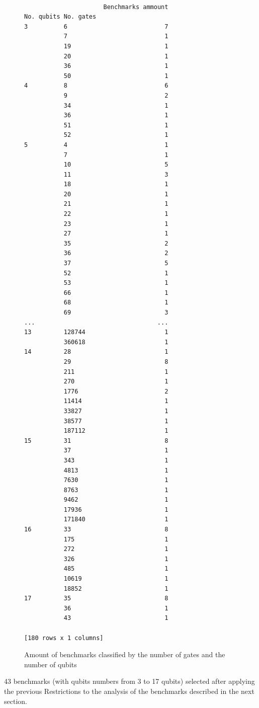\documentclass{book}
\begin{document}
\begin{figure}
\centering

\begin{verbatim}

                      Benchmarks ammount
No. qubits No. gates
3          6                           7
           7                           1
           19                          1
           20                          1
           36                          1
           50                          1
4          8                           6
           9                           2
           34                          1
           36                          1
           51                          1
           52                          1
5          4                           1
           7                           1
           10                          5
           11                          3
           18                          1
           20                          1
           21                          1
           22                          1
           23                          1
           27                          1
           35                          2
           36                          2
           37                          5
           52                          1
           53                          1
           66                          1
           68                          1
           69                          3
...                                  ...
13         128744                      1
           360618                      1
14         28                          1
           29                          8
           211                         1
           270                         1
           1776                        2
           11414                       1
           33827                       1
           38577                       1
           187112                      1
15         31                          8
           37                          1
           343                         1
           4813                        1
           7630                        1
           8763                        1
           9462                        1
           17936                       1
           171840                      1
16         33                          8
           175                         1
           272                         1
           326                         1
           485                         1
           10619                       1
           18852                       1
17         35                          8
           36                          1
           43                          1

[180 rows x 1 columns]

\end{verbatim}



\label{code:q_gate_bench}
\caption{Amount of benchmarks classified by the number of gates and the number of qubits}
\end{figure}
43 benchmarks (with qubits numbers from 3 to 17 qubits) selected after applying the previous Restrictions to the analysis of the benchmarks described in the next section.
\end{document}
